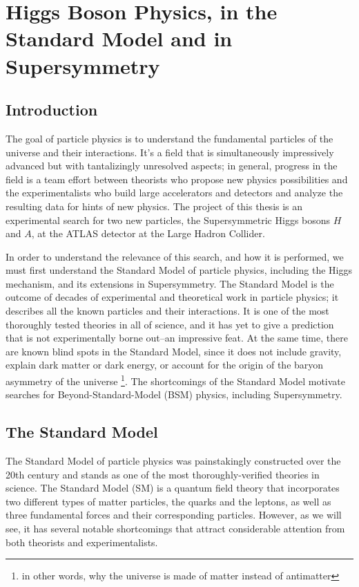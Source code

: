  

\chapter[Theory of Higgs Physics]{Higgs Boson Physics, in the Standard Model and in Supersymmetry}
\label{chapter:Theory}



\section{Introduction}
The goal of particle physics is to understand the fundamental particles of the universe and 
their interactions. It's a field that is simultaneously impressively advanced but 
with tantalizingly unresolved aspects; in general, progress in the field is a team 
effort between theorists who propose new physics possibilities and the experimentalists who build 
large accelerators and detectors and analyze the resulting data for hints of new physics.  The project of this thesis is 
an experimental search for two new particles, the Supersymmetric Higgs bosons $H$ 
and $A$, at the ATLAS detector at the Large Hadron Collider.

In order to understand the relevance of this search, and how it is performed, 
we must first understand the Standard Model of particle physics, including the Higgs mechanism, 
and its extensions in Supersymmetry.  The Standard Model is the outcome of decades of 
experimental and theoretical work in particle physics; it describes all the known particles and 
their interactions.  It is one of the most thoroughly tested theories in all of 
science, and it has yet to give a prediction that is not experimentally borne 
out--an impressive feat.  At the same time, there are known blind 
spots in the Standard Model, since it does not include gravity, explain dark 
matter or dark energy, or account for the origin of the baryon asymmetry of the universe
\footnote{in other words, why the universe is made of matter instead of antimatter}.   The shortcomings of the 
Standard Model motivate searches for Beyond-Standard-Model (BSM) physics, including Supersymmetry.  


\section{The Standard Model}
The Standard Model of particle physics was painstakingly constructed over the 20th century and stands 
as one of the most thoroughly-verified theories in science.  The Standard Model 
(SM) is a quantum field theory that incorporates two different types of matter 
particles, the quarks and the leptons, as well as three fundamental forces and 
their corresponding particles.  However, as we will see, it has several notable 
shortcomings that attract considerable attention from both theorists and experimentalists.  

